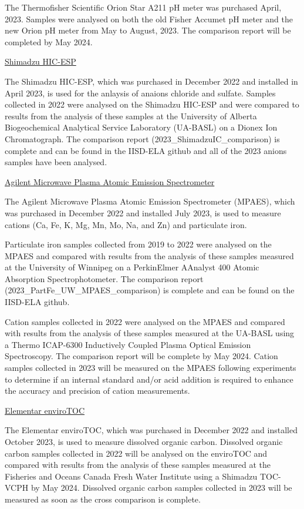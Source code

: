 \documentclass[
]{article}
\begin{document}
The Thermofisher Scientific Orion Star A211 pH meter was purchased
April, 2023. Samples were analysed on both the old Fisher Accumet pH
meter and the new Orion pH meter from May to August, 2023. The
comparison report will be completed by May 2024.

\underline{Shimadzu HIC-ESP}

The Shimadzu HIC-ESP, which was purchased in December 2022 and installed
in April 2023, is used for the anlaysis of anaions chloride and sulfate.
Samples collected in 2022 were analysed on the Shimadzu HIC-ESP and were
compared to results from the analysis of these samples at the University
of Alberta Biogeochemical Analytical Service Laboratory (UA-BASL) on a
Dionex Ion Chromatograph. The comparison report
(2023\_ShimadzuIC\_comparison) is complete and can be found in the
IISD-ELA github and all of the 2023 anions samples have been analysed.

\underline{Agilent Microwave Plasma Atomic Emission Spectrometer}

The Agilent Microwave Plasma Atomic Emission Spectrometer (MPAES), which
was purchased in December 2022 and installed July 2023, is used to
measure cations (Ca, Fe, K, Mg, Mn, Mo, Na, and Zn) and particulate
iron.

Particulate iron samples collected from 2019 to 2022 were analysed on
the MPAES and compared with results from the analysis of these samples
measured at the University of Winnipeg on a PerkinElmer AAnalyst 400
Atomic Absorption Spectrophotometer. The comparison report
(2023\_PartFe\_UW\_MPAES\_comparison) is complete and can be found on
the IISD-ELA github.

Cation samples collected in 2022 were analysed on the MPAES and compared
with results from the analysis of these samples measured at the UA-BASL
using a Thermo ICAP-6300 Inductively Coupled Plasma Optical Emission
Spectroscopy. The comparison report will be complete by May 2024. Cation
samples collected in 2023 will be measured on the MPAES following
experiments to determine if an internal standard and/or acid addition is
required to enhance the accuracy and precision of cation measurements.

\pagebreak

\underline{Elementar enviroTOC}

The Elementar enviroTOC, which was purchased in December 2022 and
installed October 2023, is used to measure dissolved organic carbon.
Dissolved organic carbon samples collected in 2022 will be analysed on
the enviroTOC and compared with results from the analysis of these
samples measured at the Fisheries and Oceans Canada Fresh Water
Institute using a Shimadzu TOC-VCPH by May 2024. Dissolved organic
carbon samples collected in 2023 will be measured as soon as the cross
comparison is complete.
\end{document}
